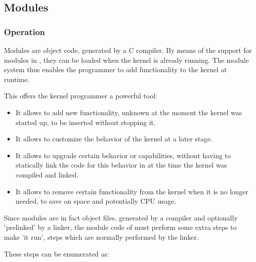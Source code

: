 %
%

\subsection{Modules}

\subsubsection{Operation}

Modules are object code, generated by a C
compiler. By means of the support for modules in \oswald, they can be loaded when 
the kernel is already running. The module system thus enables the programmer 
to add functionality to the kernel at runtime.

This offers the kernel programmer a powerful tool:

\begin{itemize}
\item It allows to add new functionality, unknown at the moment the kernel
was started up, to be inserted without stopping it.
\item It allows to customize the behavior of the kernel at a later stage.
\item It allows to upgrade certain behavior or capabilities, without
having to statically link the code for this behavior in at the time the
kernel was compiled and linked.
\item It allows to remove certain functionality from the kernel when it is
no longer needed, to save on space and potentially CPU usage.
\end{itemize}

Since modules are in fact object files, generated by a compiler and
optionally 'prelinked' by a linker, the module code of \oswald must perform
some extra steps to make 'it run', steps which are normally performed
by the linker.

These steps can be enumerated as:

